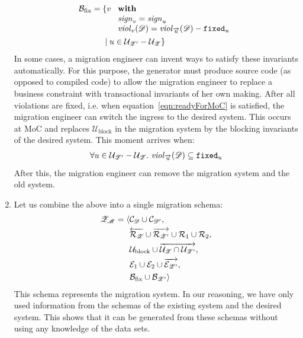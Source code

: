 \documentclass[runningheads]{llncs}
\newcommand{\id}[1]{\text{\it #1\/}}
\newcommand{\viol}[2]{\violC{#1}(#2)}
\newcommand{\violC}[1]{\id{viol}_{#1}}
\newcommand{\sign}[1]{\id{sign}_{#1}}
\newcommand{\concepts}{\mathcal{C}}
\newcommand{\rels}{\mathcal{R}}   %
\newcommand{\rules}{\mathcal{U}}
\newcommand{\transactions}{\mathcal{E}}
\newcommand{\busConstraints}{\mathcal{B}}
\newcommand{\dataset}{\mathscr{D}}
\newcommand{\schema}{\mathscr{Z}}
\newcommand{\migrsys}{\mathscr{M}}
\begin{document}
\begin{enumerate}
   \begin{align}
      \busConstraints_\text{fix}={}&\{v\ 
      \begin{array}[t]{l}
         \text{\bf with}\label{eqn:Bfix}\\
         \sign{v}=\sign{u}\\
         \viol{v}{\dataset}=\viol{\overrightarrow{u}}{\dataset}-{\tt fixed}_u
      \end{array}\\
      &\mid u\in\rules_{\schema'}-\rules_{\schema}\}\notag
   \end{align}
   In some cases, a migration engineer can invent ways to satisfy these invariants automatically.
   For this purpose, the generator must produce source code (as opposed to compiled code) to allow the migration engineer
   to replace a business constraint with transactional invariants of her own making.
   After all violations are fixed, i.e. when equation~\ref{eqn:readyForMoC} is satisfied,
   the migration engineer can switch the ingress to the desired system.
   This occurs at MoC and
   replaces $\rules_\text{block}$ in the migration system by the blocking invariants of the desired system.
   This moment arrives when:
   \begin{align}
      \forall u\in\rules_{\schema'}-\rules_{\schema}.~\viol{\overrightarrow{u}}{\dataset}\subseteq{\tt fixed}_u
   \label{eqn:readyForMoC}
   \end{align}
   After this, the migration engineer can remove the migration system and the old system.

\item Let us combine the above into a single migration schema:
   \begin{align}
      \schema_\migrsys=\langle{}&\concepts_\dataset\cup\concepts_{\dataset'},\label{eqn:schema migrsys}\\
      &\overleftarrow{\rels_{\schema}}\cup\overrightarrow{\rels_{\schema'}}\cup\rels_1\cup\rels_2,\notag\\
      &\rules_\text{block}\cup\overrightarrow{\rules_{\schema}\cap\rules_{\schema'}},\notag\\
      &\transactions_1\cup\transactions_2\cup\overrightarrow{\transactions_{\schema'}},\notag\\
      &\busConstraints_\text{fix}\cup\busConstraints_{\schema'}\rangle\notag
   \end{align}
   This schema represents the migration system.
   In our reasoning, we have only used information from the schemas of the existing system and the desired system.
   This shows that it can be generated from these schemas without using any knowledge of the data sets.
\end{enumerate}
\end{document}
